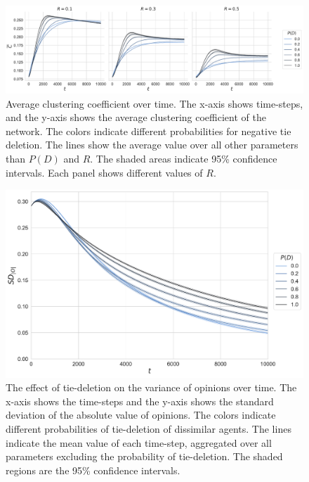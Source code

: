 \documentclass[11pt]{article}
\begin{document}
\begin{figure}[H]
    \centering
    \includegraphics[width=.9\linewidth]{../plots/overall/Average_Clustering_Coefficient_Ties_Deleted.pdf}
  \caption{Average clustering coefficient over time. The x-axis shows time-steps, and the y-axis shows the average clustering coefficient of the network. The colors indicate different probabilities for negative tie deletion. The lines show the average value over all other parameters than $P(D)$ and $R$. The shaded areas indicate 95\% confidence intervals. Each panel shows different values of $R$.}
  \label{appendix:clustering}
\end{figure}

\begin{figure}[H]
    \centering
    \includegraphics[width=.9\linewidth]{../plots/overall/Standard_Deviation_Absolute_Opinion_Tie_Deletion.pdf}
  \caption{The effect of tie-deletion on the variance of opinions over time. The x-axis shows the time-steps and the y-axis shows the standard deviation of the absolute value of opinions. The colors indicate different probabilities of tie-deletion of dissimilar agents. The lines indicate the mean value of each time-step, aggregated over all parameters excluding the probability of tie-deletion. The shaded regions are the 95\% confidence intervals. }
  \label{appendix:pd_sd}
\end{figure}
\end{document}
